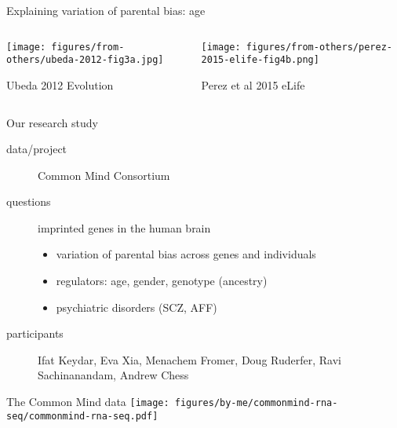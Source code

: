 \documentclass{beamer}
\begin{document}
\begin{frame}[label=previous-age-studies]{Explaining variation of parental bias: age}
\begin{columns}[t]
\begin{column}{0.5\textwidth}

\texttt{[image: figures/from-others/ubeda-2012-fig3a.jpg]}

{\tiny Ubeda 2012 Evolution}
\end{column}

\begin{column}{0.5\textwidth}

\texttt{[image: figures/from-others/perez-2015-elife-fig4b.png]}

{\tiny Perez et al 2015 eLife}
\end{column}
\end{columns}
\end{frame}

\begin{frame}[label=our-study]{Our research study}
\begin{description}
\item[data/project] Common Mind Consortium
\item[questions] imprinted genes in the human brain
\begin{itemize}
\item variation of parental bias across genes and individuals
\item regulators: age, gender, genotype (ancestry)
\item psychiatric disorders (SCZ, AFF)  
\end{itemize}
\item[participants] \alert{Ifat Keydar}, Eva Xia, Menachem Fromer, Doug Ruderfer, Ravi Sachinanandam, Andrew Chess
\end{description}
\end{frame}

\begin{frame}[label=cmc]{The Common Mind data}
\texttt{[image: figures/by-me/commonmind-rna-seq/commonmind-rna-seq.pdf]}
\end{frame}
\end{document}
